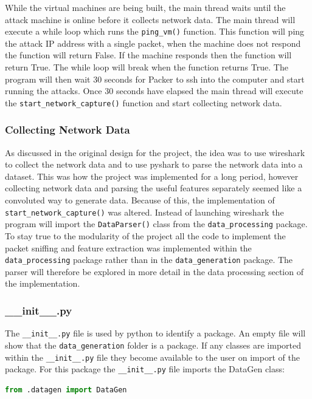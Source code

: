 While the virtual machines are being built, the main thread waits until the attack machine is online before it collects network data. The main thread will execute a while loop which runs the \texttt{ping\_vm()} function. This function will ping the attack IP address with a single packet, when the machine does not respond the function will return False. If the machine responds then the function will return True. The while loop will break when the function returns True. The program will then wait 30 seconds for Packer to ssh into the computer and start running the attacks. Once 30 seconds have elapsed the main thread will execute the \texttt{start\_network\_capture()} function and start collecting network data. 

\subsubsection{Collecting Network Data}
As discussed in the original design for the project, the idea was to use wireshark to collect the network data and to use pyshark to parse the network data into a dataset. This was how the project was implemented for a long period, however collecting network data and parsing the useful features separately seemed like a convoluted way to generate data. Because of this, the implementation of \texttt{start\_network\_capture()} was altered. Instead of launching wireshark the program will import the \texttt{DataParser()} class from the \texttt{data\_processing} package. To stay true to the modularity of the project all the code to implement the packet sniffing and feature extraction was implemented within the \texttt{data\_processing} package rather than in the \texttt{data\_generation} package. The parser will therefore be explored in more detail in the data processing section of the implementation. 

\subsubsection{\_\_init\_\_.py}
The \texttt{\_\_init\_\_.py} file is used by python to identify a package. An empty file will show that the \texttt{data\_generation} folder is a package. If any classes are imported within the \texttt{\_\_init\_\_.py} file they become available to the user on import of the package. For this package the \texttt{\_\_init\_\_.py} file imports the DataGen class:
\begin{lstlisting}[language = python]
    from .datagen import DataGen
\end{lstlisting}

